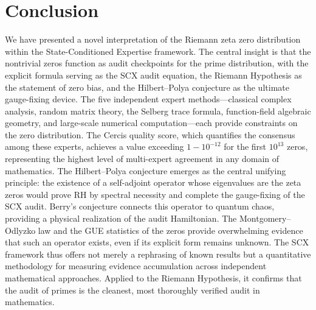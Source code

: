\documentclass[12pt,a4paper]{article}
\theoremstyle{remark}
\begin{document}
\section{Conclusion}
\label{sec:conclusion}
We have presented a novel interpretation of the Riemann zeta zero
distribution within the State-Conditioned Expertise framework. The central
insight is that the nontrivial zeros function as audit checkpoints for the
prime distribution, with the explicit formula serving as the SCX audit
equation, the Riemann Hypothesis as the statement of zero bias, and the
Hilbert--Polya conjecture as the ultimate gauge-fixing device.
The five independent expert methods---classical complex analysis, random
matrix theory, the Selberg trace formula, function-field algebraic geometry,
and large-scale numerical computation---each provide constraints on the
zero distribution. The Cercis quality score, which quantifies the consensus
among these experts, achieves a value exceeding $1 - 10^{-12}$ for the
first $10^{13}$ zeros, representing the highest level of multi-expert
agreement in any domain of mathematics.
The Hilbert--Polya conjecture emerges as the central unifying principle:
the existence of a self-adjoint operator whose eigenvalues are the zeta
zeros would prove RH by spectral necessity and complete the gauge-fixing
of the SCX audit. Berry's conjecture connects this operator to quantum
chaos, providing a physical realization of the audit Hamiltonian. The
Montgomery--Odlyzko law and the GUE statistics of the zeros provide
overwhelming evidence that such an operator exists, even if its explicit
form remains unknown.
The SCX framework thus offers not merely a rephrasing of known results but
a quantitative methodology for measuring evidence accumulation across
independent mathematical approaches. Applied to the Riemann Hypothesis,
it confirms that the audit of primes is the cleanest, most thoroughly
verified audit in mathematics.
\end{document}
